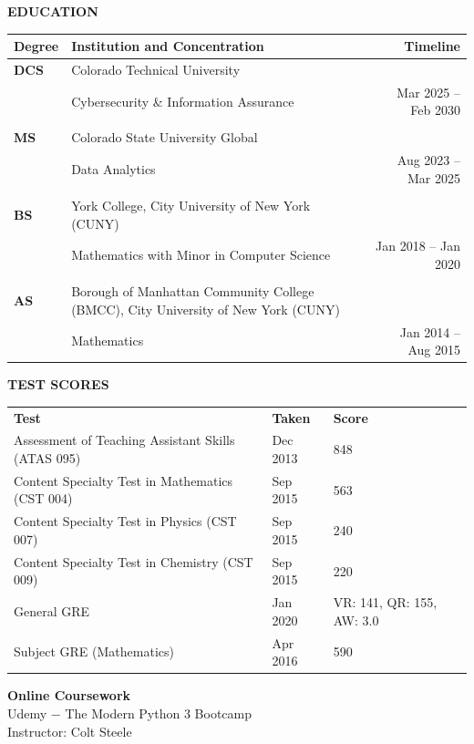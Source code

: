\documentclass[a4paper, 12pt]{article}
\begin{document}
\begin{flushleft}
\faGraduationCap\quad\textbf{EDUCATION}\\
\vspace{6pt}
\begin{tabularx}{\textwidth}{@{}lXr@{}}
\toprule
\textbf{Degree} & \textbf{Institution and Concentration} & \textbf{Timeline} \\
\midrule
\textbf{DCS} & Colorado Technical University\\
            & Cybersecurity \& Information Assurance & Mar 2025 – Feb 2030 \\
\\
\textbf{MS} & Colorado State University Global\\
            & Data Analytics & Aug 2023 – Mar 2025 \\
\\
\textbf{BS} & York College, City University of New York (CUNY)\\
            & Mathematics with Minor in Computer Science & Jan 2018 – Jan 2020 \\
\\
\textbf{AS} & Borough of Manhattan Community College (BMCC), City University of New York (CUNY)\\
            & Mathematics & Jan 2014 – Aug 2015 \\
\bottomrule
\end{tabularx}

\end{flushleft}

\begin{flushleft}
    \faChalkboard\qquad\textbf{TEST SCORES}
    \begin{table}[h!]
        \centering
        \begin{tabular}{lll}
           \textbf{Test}  &  \textbf{Taken}  &  \textbf{Score}\\
            Assessment of Teaching Assistant Skills (ATAS 095) & Dec 2013 & 848\\
            Content Specialty Test in Mathematics (CST 004) & Sep 2015 & 563\\
            Content Specialty Test in Physics (CST 007) & Sep 2015 & 240\\
            Content Specialty Test in Chemistry (CST 009) & Sep 2015 & 220\\
            General GRE & Jan 2020 & VR: 141, QR: 155, AW: 3.0\\
            Subject GRE (Mathematics) & Apr 2016 & 590
        \end{tabular}
        \label{tab:my_label}
    \end{table}

    \begin{flushleft}
        \textbf{Online Coursework}\\
        Udemy $-$ The Modern Python 3 Bootcamp\\
        Instructor: Colt Steele
    \end{flushleft}
\end{flushleft}
\end{document}
